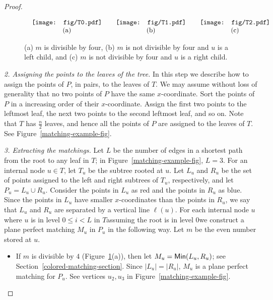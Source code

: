 \documentclass[11pt,a4paper]{article}
\newcommand{\Min}[2]{\text{\sf Min$(#1,#2)$}}
\begin{document}
\begin{proof}
\begin{figure}[htb]
  \centering
\setlength{\tabcolsep}{0in}
  $\begin{tabular}{ccc}
\multicolumn{1}{m{.33\columnwidth}}{\centering\texttt{[image: fig/T0.pdf]}}&
\multicolumn{1}{m{.33\columnwidth}}{\centering\texttt{[image: fig/T1.pdf]}}
&\multicolumn{1}{m{.33\columnwidth}}{\centering\texttt{[image: fig/T2.pdf]}} \\
(a) & (b)&(c)
\end{tabular}$
  \caption{(a) $m$ is divisible by four, (b) $m$ is not divisible by four and $u$ is a left child, and (c) $m$ is not divisible by four and $u$ is a right child.}
\label{tree-construction-fig}
\end{figure}

\begin{paragraph}{\em \small 2. Assigning the points to the leaves of the tree.}
In this step we describe how to assign the points of $P$, in pairs, to the leaves of $T$. We may assume without loss of generality that no two points of $P$ have the same $x$-coordinate. Sort the points of $P$ in a increasing order of their $x$-coordinate.
Assign the first two points to the leftmost leaf, the next two points to the second leftmost leaf, and so on. Note that $T$ has $\frac{n}{2}$ leaves, and hence all the points of $P$ are assigned to the leaves of $T$. See Figure~\ref{matching-example-fig}.  
\end{paragraph}

\begin{paragraph}{\em \small 3. Extracting the matchings.}
Let $L$ be the number of edges in a shortest path from the root to any leaf in $T$; in Figure~\ref{matching-example-fig}, $L=3$. For an internal node $u\in T$, let $T_u$ be the subtree rooted at $u$. Let $L_u$ and $R_u$ be the set of points assigned to the left and right subtrees of $T_u$, respectively, and let $P_u=L_u\cup R_u$. Consider the points in $L_u$ as red and the points in $R_u$ as blue. Since the points in $L_u$ have smaller $x$-coordinates than the points in $R_u$, we say that $L_u$ and $R_u$ are separated by a vertical line $\ell(u)$. For each internal node $u$ where $u$ is in level $0\le i< L$ in $T$\textemdash assuming the root is in level $0$\textemdash we construct a plane perfect matching $M_u$ in $P_u$ in the following way. Let $m$ be the even number stored at $u$.
\begin{itemize}
  \item If $m$ is divisible by $4$ (Figure~\ref{tree-construction-fig}(a)), then let $M_u=\Min{L_u}{R_u}$; see Section~\ref{colored-matching-section}. Since $|L_u|=|R_u|$, $M_u$ is a plane perfect matching for $P_u$. See vertices $u_2, u_3$ in Figure~\ref{matching-example-fig}.


\end{itemize}
\end{paragraph}
\end{proof}
\end{document}

